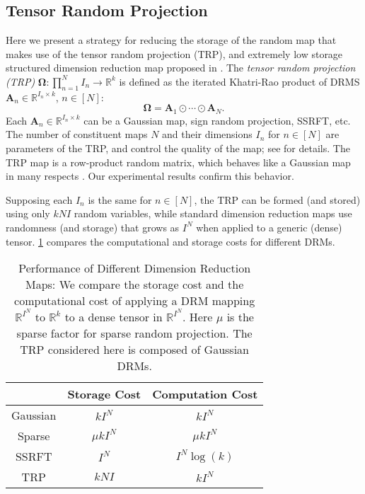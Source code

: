 \subsection{Tensor Random Projection}\label{s-trp}
Here we present a strategy for reducing the storage of the random map
that makes use of the tensor random projection (TRP),
and extremely low storage structured dimension reduction map
proposed in \cite{sun2018tensor}.
The \emph{tensor random projection (TRP)}
$\mathbf{\Omega}: \prod_{n=1}^N I_n \to \mathbb{R}^k$ is defined as
the iterated Khatri-Rao product of DRMS
$\mathbf{A}_n \in \mathbb{R}^{I_n \times k}$, $n \in [N]$:
\begin{equation}
\label{eq:TRP}
\mathbf{\Omega} = \mathbf{A}_1 \odot \cdots \odot \mathbf{A}_N.
\end{equation}
Each $\mathbf{A}_n \in \mathbb{R}^{I_n \times k}$
can be a Gaussian map, sign random projection, SSRFT, etc.
The number of constituent maps $N$ and their dimensions $I_n$ for $n \in [N]$
are parameters of the TRP,
and control the quality of the map; see \cite{sun2018tensor} for details.
The TRP map is a row-product random matrix,
which behaves like a Gaussian map in many respects \cite{rudelson2012row}.
Our experimental results confirm this behavior.

Supposing each $I_n$ is the same for $n \in [N]$,
the TRP can be formed (and stored) using only $kNI$ random variables,
while standard dimension reduction maps use randomness (and storage)
that grows as $I^N$ when applied to a generic (dense) tensor.
\ref{tbl: random_map} compares the computational and storage costs
for different DRMs.
\begin{table}[ht]
	\centering
	\begin{tabular}{c|c|c}
		& Storage Cost & Computation Cost \\ \hline
		Gaussian                                                            & $kI^N$       & $kI^N$           \\ \hline
		Sparse                                                              & $\mu kI^N$    & $\mu kI^N$        \\ \hline
		SSRFT                                                               & $I^N$        & $I^N\log(k)$     \\ \hline
		TRP & $kNI$        & $kI^N$
	\end{tabular}
	\caption{Performance of Different Dimension Reduction Maps:
  We compare the storage cost and the computational cost of applying a DRM
	mapping $\mathbb{R}^{I^N}$ to $\mathbb{R}^k$
  to a dense tensor in $\mathbb{R}^{I^N}$. Here $\mu$ is the sparse factor for sparse random projection. 
	The TRP considered here is composed of Gaussian DRMs.
	}\label{tbl: random_map}
\end{table}

